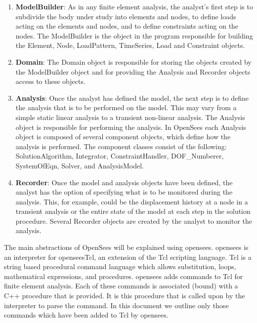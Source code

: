 \documentclass[12pt]{article}
\begin{document}
\begin{enumerate}
\item {\bf ModelBuilder}: As in any finite element analysis, the analyst's first
step is to subdivide the body under study into elements and nodes,
to define loads acting on the elements and nodes, and to define constraints
acting on the nodes. The ModelBuilder is the object in the program
responsible for building the Element, Node, LoadPattern, TimeSeries,
Load and Constraint objects.

\item {\bf Domain}: The Domain object is responsible for
storing the objects created by the ModelBuilder object and for providing the
Analysis and Recorder objects access to these objects.

\item {\bf Analysis}: Once the analyst has defined the model, the next step
is to define the analysis that is to be performed on the model. This
may vary from a simple static linear analysis to a transient
non-linear analysis. The Analysis object is responsible for performing
the analysis. In OpenSees each Analysis object is composed of several component
objects, which define how the analysis is performed. The component
classes consist of the following: { SolutionAlgorithm}, {
Integrator}, { ConstraintHandler}, { DOF\_Numberer}, {
SystemOfEqn}, { Solver}, and { AnalysisModel}. 

\item {\bf Recorder}: Once the model and analysis objects have been
defined, the analyst has the option of specifying what is to be
monitored during the analysis. This, for example, could be the
displacement history at a node in a transient analysis or the entire
state of the model at each step in the solution procedure. Several
Recorder objects are created by the analyst to monitor the analysis.
\end{enumerate}

The main abstractions of OpenSees will be explained using opensees. opensees is an
interpreter for openseesTcl, an extension of the Tcl scripting language.
Tcl is a string based procedural command language which allows
substitution, loops, mathematical expressions, and procedures. 
opensees adds commands to Tcl for finite element analysis.
Each of these commands is associated (bound) with a C++
procedure that is provided. It is this procedure that is called upon
by the interpreter to parse the command. In this document we
outline only those commands which have been added to Tcl by
opensees. 
\end{document}
